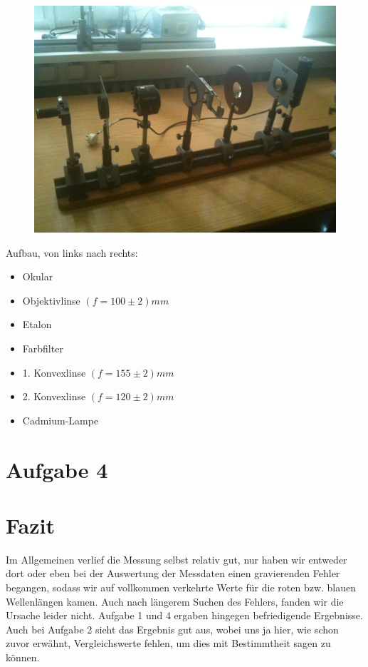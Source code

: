 \documentclass{article}
\begin{document}
\begin{figure}[H]
\includegraphics[width=\textwidth]{IMG_0021}
\end{figure}
Aufbau, von links nach rechts: 
\begin{itemize}
\item Okular
\item Objektivlinse $(f=100\pm 2)mm$
\item Etalon
\item Farbfilter
\item 1. Konvexlinse $(f=155\pm 2)mm$
\item 2. Konvexlinse $(f=120\pm 2)mm$
\item Cadmium-Lampe
\end{itemize}




\section{Aufgabe 4}



\section{Fazit}
Im Allgemeinen verlief die Messung selbst relativ gut, nur haben wir entweder dort oder eben bei der Auswertung der Messdaten einen gravierenden Fehler begangen, sodass wir auf vollkommen verkehrte Werte für die roten bzw. blauen Wellenlängen kamen. Auch nach längerem Suchen des Fehlers, fanden wir die Ursache leider nicht. Aufgabe 1 und 4 ergaben hingegen befriedigende Ergebnisse. Auch bei Aufgabe 2 sieht das Ergebnis gut aus, wobei uns ja hier, wie schon zuvor erwähnt, Vergleichswerte fehlen, um dies mit Bestimmtheit sagen zu können.
\end{document}
